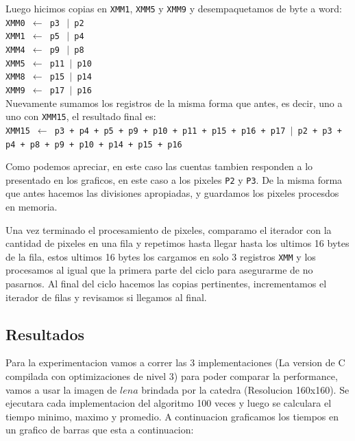 Luego hicimos copias en \texttt{XMM1}, \texttt{XMM5} y \texttt{XMM9} y desempaquetamos de byte a word:\\

\noindent
\texttt{XMM0 $\gets$ p3 $\ \vert$ p2}\\
\texttt{XMM1 $\gets$ p5 $\ \vert$ p4}\\
\texttt{XMM4 $\gets$ p9 $\ \vert$ p8}\\
\texttt{XMM5 $\gets$ p11 $\vert$ p10}\\
\texttt{XMM8 $\gets$ p15 $\vert$ p14}\\
\texttt{XMM9 $\gets$ p17 $\vert$ p16}\\

Nuevamente sumamos los registros de la misma forma que antes, es decir, uno a uno con \texttt{XMM15}, el resultado final es:\\

\noindent
\texttt{XMM15 $\gets$ p3 + p4 + p5 + p9 + p10 + p11 + p15 + p16 + p17 $\vert$ p2 + p3 + p4 + p8 + p9 + p10 + p14 + p15 + p16}

Como podemos apreciar, en este caso las cuentas tambien responden a lo presentado en los graficos, en este caso a los pixeles \texttt{P2} y \texttt{P3}. De la misma forma que antes hacemos las divisiones apropiadas, y guardamos los pixeles procesdos en memoria.

Una vez terminado el procesamiento de pixeles, comparamo el iterador con la cantidad de pixeles en una fila y repetimos hasta llegar hasta los ultimos 16 bytes de la fila, estos ultimos 16 bytes los cargamos en solo 3 registros \texttt{XMM} y los procesamos al igual que la primera parte del ciclo para asegurarme de no pasarnos. Al final del ciclo hacemos las copias pertinentes, incrementamos el iterador de filas y revisamos si llegamos al final. \\

\subsection{Resultados}
Para la experimentacion vamos a correr las 3 implementaciones (La version de C compilada con optimizaciones de nivel 3) para poder comparar la performance, vamos a usar la imagen de $lena$ brindada por la catedra (Resolucion 160x160). Se ejecutara cada implementacion del algoritmo 100 veces y luego se calculara el tiempo minimo, maximo y promedio. A continuacion graficamos los tiempos en un grafico de barras que esta a continuacion:

